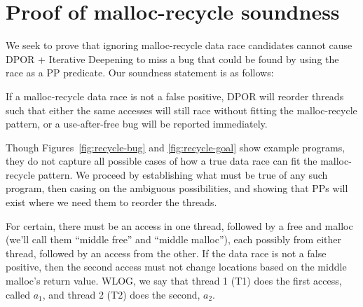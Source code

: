 \section{Proof of malloc-recycle soundness}
\label{sec:proof}

We seek to prove that ignoring malloc-recycle data race candidates cannot cause DPOR + Iterative Deepening to miss a bug
that could be found by using the race as a PP predicate. Our soundness statement is as follows:

\begin{theorem}
	If a malloc-recycle data race is not a false positive, DPOR will reorder threads such that either the same accesses will still race without fitting the malloc-recycle pattern, or a use-after-free bug will be reported immediately.
\end{theorem}

Though Figures~\ref{fig:recycle-bug} and \ref{fig:recycle-goal} show example programs, they do not capture all possible cases of how a true data race can fit the malloc-recycle pattern.
We proceed by establishing what must be true of any such program, then casing on the ambiguous possibilities, and showing that PPs will exist where we need them to reorder the threads.

For certain, there must be an access in one thread, followed by a free and malloc (we'll call them ``middle free'' and ``middle malloc''), each possibly from either thread, followed by an access from the other.
If the data race is not a false positive, then the second access must not change locations based on the middle malloc's return value.
WLOG, we say that thread 1 (T1) does the first access, called $a_1$, and thread 2 (T2) does the second, $a_2$.

